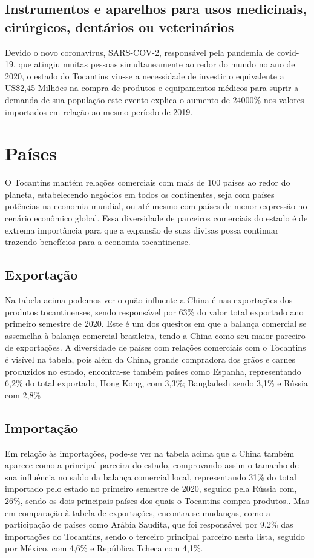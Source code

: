 \subsection{Instrumentos e aparelhos para usos medicinais, cirúrgicos, dentários ou veterinários}
\par Devido o novo coronavírus, SARS-COV-2, responsável pela pandemia de covid-19, que atingiu muitas pessoas simultaneamente ao redor do mundo no ano de 2020, o estado do Tocantins viu-se a necessidade de investir o equivalente a US\$2,45 Milhões na compra de produtos e equipamentos médicos para suprir a demanda de sua população este evento explica o aumento de 24000\% nos valores importados em relação ao mesmo período de 2019.

\section{Países}
\par O Tocantins mantém relações comerciais com mais de 100 países ao redor do planeta, estabelecendo negócios em todos os continentes, seja com países potências na economia mundial, ou até mesmo com países de menor expressão no cenário econômico global. Essa diversidade de parceiros comerciais do estado é de extrema importância para que a expansão de suas divisas possa continuar trazendo benefícios para a economia tocantinense.

\subsection {Exportação}
\par Na tabela acima podemos ver o quão influente a China é nas exportações dos produtos tocantinenses, sendo responsável por 63\% do valor total exportado ano primeiro semestre de 2020. Este é um dos quesitos em que a balança comercial se assemelha à balança comercial brasileira, tendo a China como seu maior parceiro de exportações. 
A diversidade de países com relações comerciais com o Tocantins é visível na tabela, pois além da China, grande compradora dos grãos e carnes produzidos no estado, encontra-se também países como Espanha, representando 6,2\% do total exportado, Hong Kong, com 3,3\%; Bangladesh sendo 3,1\% e Rússia com 2,8\%

\subsection {Importação}
\par Em relação às importações, pode-se ver na tabela acima que a China também aparece como a principal parceira do estado, comprovando assim o tamanho de sua influência no saldo da balança comercial local, representando 31\% do total importado pelo estado no primeiro semestre de 2020, seguido pela Rússia com, 26\%, sendo os dois principais países dos quais o Tocantins compra produtos.. Mas em comparação à tabela de exportações, encontra-se mudanças, como a participação de países como Arábia Saudita, que foi responsável por 9,2\% das importações do Tocantins, sendo o terceiro principal parceiro nesta lista, seguido por México, com 4,6\% e República Tcheca com 4,1\%.

